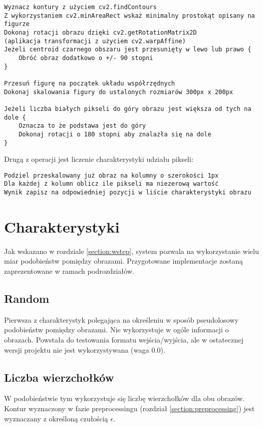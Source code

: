 \documentclass{mwart}
\begin{document}
\begin{verbatim}
Wyznacz kontury z użyciem cv2.findContours
Z wykorzystaniem cv2.minAreaRect wskaż minimalny prostokąt opisany na figurze
Dokonaj rotacji obrazu dzięki cv2.getRotationMatrix2D
(aplikacja transformacji z użyciem cv2.warpAffine)
Jeżeli centroid czarnego obszaru jest przesunięty w lewo lub prawo {
    Obróć obraz dodatkowo o +/- 90 stopni
}

Przesuń figurę na początek układu współrzędnych
Dokonaj skalowania figury do ustalonych rozmiarów 300px x 200px

Jeżeli liczba białych pikseli do góry obrazu jest większa od tych na dole {
    Oznacza to że podstawa jest do góry
    Dokonaj rotacji o 180 stopni aby znalazła się na dole
}
\end{verbatim}

Drugą z operacji jest liczenie charakterystyki udziału pikseli:
\begin{verbatim}
Podziel przeskalowany już obraz na kolumny o szerokości 1px
Dla każdej z kolumn oblicz ile pikseli ma niezerową wartość
Wynik zapisz na odpowiedniej pozycji w liście charakterystyki obrazu
\end{verbatim}

\section{Charakterystyki}
Jak wskazano w rozdziale \ref{section:wstep}, system pozwala na wykorzystanie wielu miar podobieństw pomiędzy obrazami. Przygotowane implementacje zostaną zaprezentowane w ramach podrozdziałów.

\subsection{Random}
Pierwsza z charakterystyk polegająca na określeniu w sposób pseudolosowy podobieństw pomiędzy obrazami. Nie wykorzystuje w ogóle informacji o obrazach. Powstała do testowania formatu wejścia/wyjścia, ale w ostatecznej wersji projektu nie jest wykorzystywana (waga $0.0$).

\subsection{Liczba wierzchołków}
W podobieństwie tym wykorzystuje się liczbę wierzchołków dla obu obrazów. Kontur wyznaczony w fazie preprocessingu (rozdział \ref{section:preprocessing}) jest wyznaczany z określoną czułością $\epsilon$.
\end{document}
